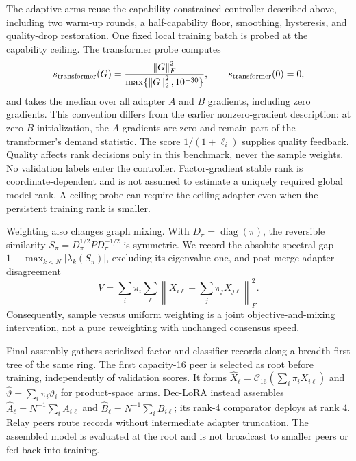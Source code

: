 \documentclass[11pt]{article}
\newcommand{\norm}[1]{\left\lVert#1\right\rVert}
\begin{document}
The adaptive arms reuse the capability-constrained controller described above, including two warm-up rounds, a half-capability floor, smoothing, hysteresis, and quality-drop restoration. One fixed local training batch is probed at the capability ceiling. The transformer probe computes
\begin{equation}
 s_{\rm transformer}(G)=\frac{\norm{G}_F^2}{\max\{\norm{G}_2^2,10^{-30}\}},
 \qquad s_{\rm transformer}(0)=0,
 \label{eq:transformer-stable-rank}
\end{equation}
and takes the median over all adapter $A$ and $B$ gradients, including zero gradients. This convention differs from the earlier nonzero-gradient description: at zero-$B$ initialization, the $A$ gradients are zero and remain part of the transformer's demand statistic. The score $1/(1+\ell_i)$ supplies quality feedback. Quality affects rank decisions only in this benchmark, never the sample weights. No validation labels enter the controller. Factor-gradient stable rank is coordinate-dependent and is not assumed to estimate a uniquely required global model rank. A ceiling probe can require the ceiling adapter even when the persistent training rank is smaller.

Weighting also changes graph mixing. With $D_\pi=\operatorname{diag}(\pi)$, the reversible similarity $S_\pi=D_\pi^{1/2}PD_\pi^{-1/2}$ is symmetric. We record the absolute spectral gap $1-\max_{k<N}|\lambda_k(S_\pi)|$, excluding its eigenvalue one, and post-merge adapter disagreement
\begin{equation}
 V=\sum_i\pi_i\sum_\ell\left\|X_{i\ell}-\sum_j\pi_jX_{j\ell}\right\|_F^2.
 \label{eq:quantity-disagreement}
\end{equation}
Consequently, sample versus uniform weighting is a joint objective-and-mixing intervention, not a pure reweighting with unchanged consensus speed.

Final assembly gathers serialized factor and classifier records along a breadth-first tree of the same ring. The first capacity-16 peer is selected as root before training, independently of validation scores. It forms $\widehat X_\ell=\mathcal C_{16}(\sum_i\pi_iX_{i\ell})$ and $\widehat\vartheta=\sum_i\pi_i\vartheta_i$ for product-space arms. Dec-LoRA instead assembles $\widehat A_\ell=N^{-1}\sum_iA_{i\ell}$ and $\widehat B_\ell=N^{-1}\sum_iB_{i\ell}$; its rank-4 comparator deploys at rank 4. Relay peers route records without intermediate adapter truncation. The assembled model is evaluated at the root and is not broadcast to smaller peers or fed back into training.
\end{document}
